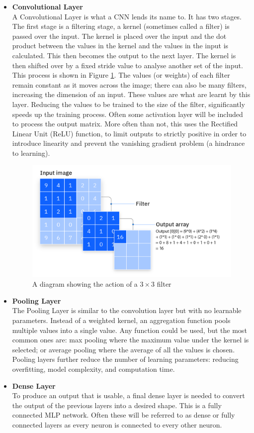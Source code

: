 \begin{itemize}
    \item \textbf{Convolutional Layer}\\
    A Convolutional Layer is what a CNN lends its name to. It has two stages. The first stage is a filtering stage, a kernel (sometimes called a filter) is passed over the input. The kernel is placed over the input and the dot product between the values in the kernel and the values in the input is calculated. This then becomes the output to the next layer. The kernel is then shifted over by a fixed stride value to analyse another set of the input. This process is shown in Figure \ref{fig:filter}. The values (or weights) of each filter remain constant as it moves across the image; there can also be many filters, increasing the dimension of an input. These values are what are learnt by this layer. Reducing the values to be trained to the size of the filter, significantly speeds up the training process. Often some activation layer will be included to process the output matrix. More often than not, this uses the Rectified Linear Unit (ReLU) function, to limit outputs to strictly positive in order to introduce linearity and prevent the vanishing gradient problem (a hindrance to learning)\cite{ibmconvolutional}.
    
    \begin{figure}[H]
        \centering
        \includegraphics[width=0.5\linewidth]{dissertation//figures/cnn-filter.png}
        \caption{A diagram showing the action of a $3 \times 3$ filter\cite{ibmconvolutional}}
        \label{fig:filter}
    \end{figure}

    \item \textbf{Pooling Layer}\\
    The Pooling Layer is similar to the convolution layer but with no learnable parameters. Instead of a weighted kernel, an aggregation function pools multiple values into a single value\cite{o2015introduction}. Any function could be used, but the most common ones are: max pooling where the maximum value under the kernel is selected; or average pooling where the average of all the values is chosen. Pooling layers further reduce the number of learning parameters: reducing overfitting, model complexity, and computation time\cite{ibmconvolutional}.

    \item \textbf{Dense Layer}\\
    To produce an output that is usable, a final dense layer is needed to convert the output of the previous layers into a desired shape. This is a fully connected MLP network. Often these will be referred to as dense or fully connected layers as every neuron is connected to every other neuron.
\end{itemize}

